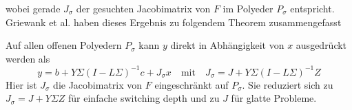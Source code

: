wobei gerade $J_\sigma$ der gesuchten Jacobimatrix von $F$ im Polyeder $P_\sigma$ entspricht. 
Griewank et al. haben dieses Ergebnis zu folgendem Theorem \cite[Proposition 2.2]{plan} zusammengefasst   
\begin{theorem}
Auf allen offenen Polyedern $P_\sigma$ kann $y$ direkt in Abhängigkeit von $x$ ausgedrückt werden als
\begin{equation}
y = b+Y\Sigma(I-L\Sigma)^{-1}c + J_\sigma x  \quad \text{mit} \quad J_\sigma = J+Y\Sigma(I-L\Sigma)^{-1} Z
\label{eq:explJacRepresentation}
\end{equation}
Hier ist $J_\sigma$ die Jacobimatrix von $F$ eingeschränkt auf $P_\sigma$. Sie reduziert sich zu $J_\sigma=J+Y\Sigma Z$ für einfache switching depth und zu $J$ für glatte Probleme.
\end{theorem}

% 
\vfill

